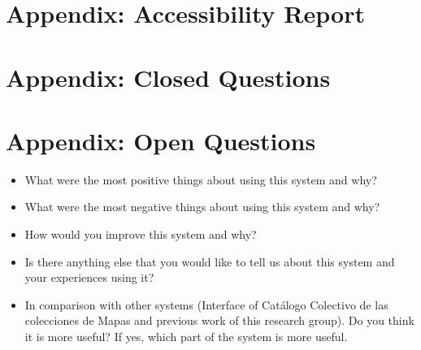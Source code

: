 \documentclass[11pt]{report}
\begin{document}
\newpage
\appendix
\chapter{Appendix: Accessibility Report}
\label{app:access}



\chapter{Appendix: Closed Questions}
\label{app:closed}



\chapter{Appendix: Open Questions}
\label{app:open}

\begin{itemize}
	\item What were the most positive things about using this system and why?
	\item What were the most negative things about using this system and why?
	\item How would you improve this system and why?
	\item Is there anything else that you would like to tell us about this system and your experiences using it?
	\item In comparison with other systems (Interface of Catálogo Colectivo de las colecciones de Mapas and previous work of this research group).
Do you think it is more useful? If yes, which part of the system is more useful.
\end{itemize}
\end{document}
